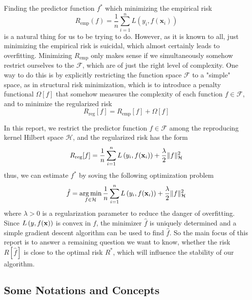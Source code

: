 Finding the predictor function $f^{*}$ which minimizing the empirical risk
\begin{equation}
	R_{\text{emp}}(f)=\frac{1}{n}\sum_{i=1}^{n}L\left(y_{i},f(\textbf{x}_{i})\right)
\end{equation}
is a natural thing for us to be trying to do. However, as it is known to all, just minimizing the empirical risk is suicidal, which almost certainly leads to overfitting. Minimizing $R_{\text{emp}}$ only makes sense if we simultaneously somehow restrict ourselves to the $\mathcal{F}$, which are of just the right level of complexity. One way to do this is by explicitly restricting the function space $\mathcal{F}$ to a "simple" space, as in structural risk minimization, which is to introduce a penalty functional $\Omega[f]$ that somehow measures the complexity of each function $f\in\mathcal{F}$, and to minimize the regularized risk
\begin{equation}
	R_{\text{reg}}[f]=R_{\text{emp}}[f]+\Omega[f]
\end{equation}

In this report, we restrict the predictor function $f\in\mathcal{F}$ among the reproducing kernel Hilbert space $\mathcal{H}$, and the regularized risk has the form
\begin{equation}
	\label{eq:regularized-risk-of-rkhs}
	R_{\text{reg}}[f]=\frac{1}{n}\sum_{i=1}^{n}L\left(y_{i},f({\bf x}_{i})\right)+\frac{\lambda}{2}\|f\|_{\mathcal{H}}^{2}
\end{equation}
thus, we can estimate $f^{*}$ by soving the following optimization problem
\begin{equation}
	\hat{f}=\underset{f\in\mathcal{H}}{\arg\min}\,\frac{1}{n}\sum_{i=1}^{n}L\left(y_{i},f({\bf x}_{i})\right)+\frac{\lambda}{2}\|f\|_{\mathcal{H}}^{2}
\end{equation}
where $\lambda>0$ is a regularization parameter to reduce the danger of overfitting. Since $L\left(y,f({\bf x})\right)$ is convex in $f$, the minimizer $\hat{f}$ is uniquely determined and a simple gradient descent algorithm can be used to find $\hat{f}$. So the main focus of this report is to answer a remaining question we want to know, whether the risk $R[\hat{f}]$ is close to the optimal risk $R^{*}$, which will influence the stability of our algorithm.

\subsection{Some Notations and Concepts}

